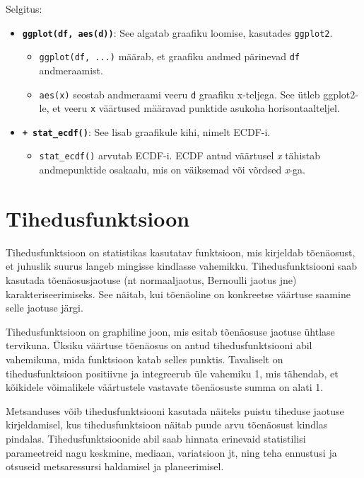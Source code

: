 \documentclass[
]{book}
\providecommand{\tightlist}{%
  \setlength{\itemsep}{0pt}\setlength{\parskip}{0pt}}
\begin{document}
Selgitus:

\begin{itemize}
\item
  \textbf{\texttt{ggplot(df,\ aes(d))}}: See algatab graafiku loomise, kasutades \texttt{ggplot2}.

  \begin{itemize}
  \tightlist
  \item
    \texttt{ggplot(df,\ ...)} määrab, et graafiku andmed pärinevad \texttt{df} andmeraamist.
  \item
    \texttt{aes(x)} seostab andmeraami veeru \texttt{d} graafiku x-teljega. See ütleb ggplot2-le, et veeru \texttt{x} väärtused määravad punktide asukoha horisontaalteljel.
  \end{itemize}
\item
  \textbf{\texttt{+\ stat\_ecdf()}}: See lisab graafikule kihi, nimelt ECDF-i.

  \begin{itemize}
  \tightlist
  \item
    \texttt{stat\_ecdf()} arvutab ECDF-i. ECDF antud väärtusel \emph{x} tähistab andmepunktide osakaalu, mis on väiksemad või võrdsed \emph{x}-ga.
  \end{itemize}
\end{itemize}

\section{Tihedusfunktsioon}\label{tihedusfunktsioon}

Tihedusfunktsioon on statistikas kasutatav funktsioon, mis kirjeldab tõenäosust, et juhuslik suurus langeb mingisse kindlasse vahemikku. Tihedusfunktsiooni saab kasutada tõenäosusjaotuse (nt normaaljaotus, Bernoulli jaotus jne) karakteriseerimiseks. See näitab, kui tõenäoline on konkreetse väärtuse saamine selle jaotuse järgi.

Tihedusfunktsioon on graphiline joon, mis esitab tõenäosuse jaotuse ühtlase tervikuna. Üksiku väärtuse tõenäosus on antud tihedusfunktsiooni abil vahemikuna, mida funktsioon katab selles punktis. Tavaliselt on tihedusfunktsioon positiivne ja integreerub üle vahemiku 1, mis tähendab, et kõikidele võimalikele väärtustele vastavate tõenäosuste summa on alati 1.

Metsanduses võib tihedusfunktsiooni kasutada näiteks puistu tiheduse jaotuse kirjeldamisel, kus tihedusfunktsioon näitab puude arvu tõenäosust kindlas pindalas. Tihedusfunktsioonide abil saab hinnata erinevaid statistilisi parameetreid nagu keskmine, mediaan, variatsioon jt, ning teha ennustusi ja otsuseid metsaressursi haldamisel ja planeerimisel.
\end{document}
